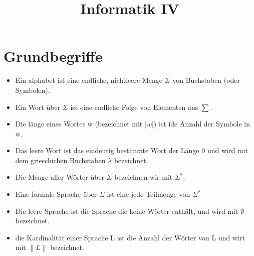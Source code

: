 \documentclass[9pt]{scrartcl}
\title{Informatik IV}
\author{}
\begin{document}
\section{Grundbegriffe}
\begin{itemize}
	\item Ein alphabet ist eine endliche, nichtleere Menge $\Sigma$ von Buchstaben  (oder Symbolen).
	\item Ein Wort über $\Sigma$ ist eine endliche Folge von Elementen aus $\sum$.
	\item Die länge eines Wortes w (bezeichnet mit $|w|$) ist ide Anzahl der Symbole in w.
	\item Das leere Wort ist das eindeutig bestimmte Wort der Länge 0 und wird mit dem grieschichen Buchstaben $\lambda$ bezeichnet.
	\item Die Menge aller Wörter über $\Sigma$ bezeichnen wir mit $\Sigma^*$.
	\item Eine formale Sprache über $\Sigma$ ist eine jede Teilmenge von $\Sigma^*$
	\item Die leere Sprache ist die Sprache die keine Wörter enthält, und wird mit $\emptyset$ bezeichnet.
	\item die Kardinalität einer Sprache L ist die Anzahl der Wörter von L und wirt mit $\|L\|$ bezeichnet.
\end{itemize}
\end{document}
